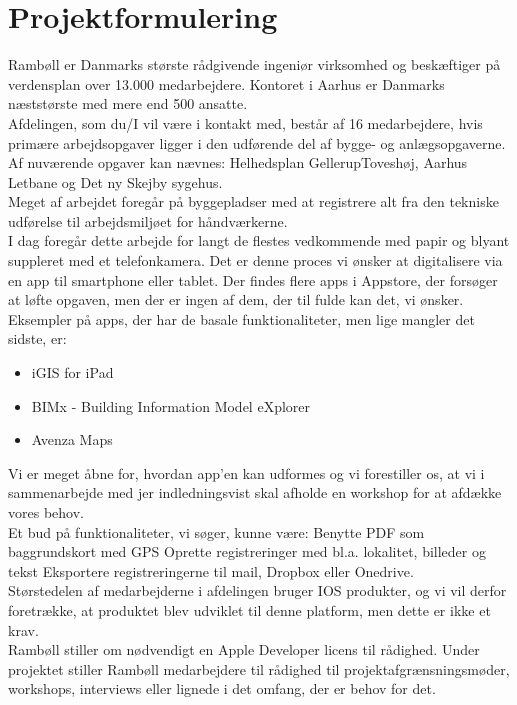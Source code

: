 \chapter{Projektformulering}

Rambøll er Danmarks største rådgivende ingeniør virksomhed og beskæftiger på verdensplan over 13.000
medarbejdere. Kontoret i Aarhus er Danmarks næststørste med mere end 500 ansatte.\\
Afdelingen, som du/I vil være i kontakt med, består af 16 medarbejdere, hvis primære arbejdsopgaver ligger i
den udførende del af bygge- og anlægsopgaverne. Af nuværende opgaver kan nævnes: Helhedsplan GellerupToveshøj,
Aarhus Letbane og Det ny Skejby sygehus.\\
Meget af arbejdet foregår på byggepladser med at registrere alt fra den tekniske udførelse til arbejdsmiljøet for
håndværkerne.\\
I dag foregår dette arbejde for langt de flestes vedkommende med papir og blyant suppleret med et
telefonkamera.
Det er denne proces vi ønsker at digitalisere via en app til smartphone eller tablet.
Der findes flere apps i Appstore, der forsøger at løfte opgaven, men der er ingen af dem, der til fulde kan det, vi
ønsker. Eksempler på apps, der har de basale funktionaliteter, men lige mangler det sidste, er:
\begin{itemize}[-]
	\item iGIS for iPad 
	\item BIMx - Building Information Model eXplorer
	\item Avenza Maps
\end{itemize}

Vi er meget åbne for, hvordan app’en kan udformes og vi forestiller os, at vi i sammenarbejde med jer indledningsvist skal afholde en workshop for at afdække vores behov.\\
Et bud på funktionaliteter, vi søger, kunne være:
Benytte PDF som baggrundskort med GPS
Oprette registreringer med bl.a. lokalitet, billeder og tekst
Eksportere registreringerne til mail, Dropbox eller Onedrive.\\
Størstedelen af medarbejderne i afdelingen bruger IOS produkter, og vi vil derfor foretrække, at produktet blev
udviklet til denne platform, men dette er ikke et krav. \\
Rambøll stiller om nødvendigt en Apple Developer licens til rådighed.
Under projektet stiller Rambøll medarbejdere til rådighed til projektafgrænsningsmøder, workshops, interviews
eller lignede i det omfang, der er behov for det. 